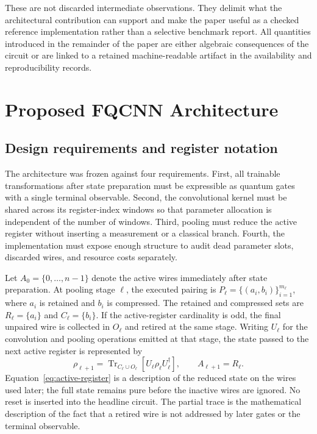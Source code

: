 \documentclass[conference]{IEEEtran}
\begin{document}
These are not discarded intermediate observations. They delimit what the
architectural contribution can support and make the paper useful as a checked
reference implementation rather than a selective benchmark report. All
quantities introduced in the remainder of the paper are either algebraic
consequences of the circuit or are linked to a retained machine-readable
artifact in the availability and reproducibility records.

\section{Proposed FQCNN Architecture}
\subsection{Design requirements and register notation}
The architecture was frozen against four requirements. First, all trainable
transformations after state preparation must be expressible as quantum gates
with a single terminal observable. Second, the convolutional kernel must be
shared across its register-index windows so that parameter allocation is
independent of the number of windows. Third, pooling must reduce the active
register without inserting a measurement or a classical branch. Fourth, the
implementation must expose enough structure to audit dead parameter slots,
discarded wires, and resource costs separately.

Let $A_0=\{0,\ldots,n-1\}$ denote the active wires immediately after state
preparation. At pooling stage $\ell$, the executed pairing is
$P_\ell=\{(a_i,b_i)\}_{i=1}^{m_\ell}$, where $a_i$ is retained and $b_i$ is
compressed. The retained and compressed sets are
$R_\ell=\{a_i\}$ and $C_\ell=\{b_i\}$. If the active-register cardinality is
odd, the final unpaired wire is collected in $O_\ell$ and retired at the same
stage. Writing $U_\ell$ for the convolution and pooling operations emitted at
that stage, the state passed to the next active register is represented by
\begin{equation}
\rho_{\ell+1}=\operatorname{Tr}_{C_\ell\cup O_\ell}
\!\left[U_\ell\rho_\ell U_\ell^{\dagger}\right],
\qquad A_{\ell+1}=R_\ell.
\label{eq:active-register}
\end{equation}
Equation~\eqref{eq:active-register} is a description of the reduced state on
the wires used later; the full state remains pure before the inactive wires are
ignored. No reset is inserted into the headline circuit. The partial trace is
the mathematical description of the fact that a retired wire is not addressed
by later gates or the terminal observable.
\end{document}
